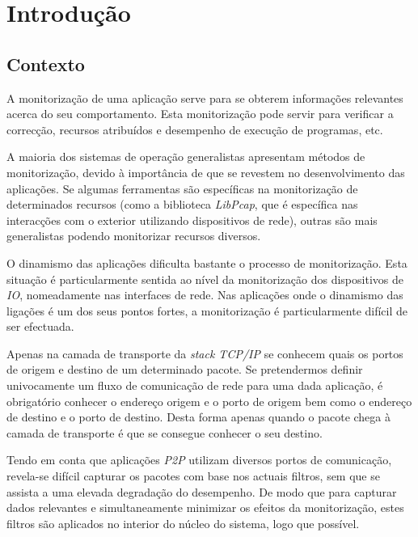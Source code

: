 \chapter{Introdução}\label{cap:introducao}

\section{Contexto}
\label{sec:intro_context}
A monitorização de uma aplicação serve para se obterem informações relevantes acerca do seu comportamento.
Esta monitorização pode servir para verificar a correcção, recursos atribuídos e desempenho de execução de programas, etc.

A maioria dos sistemas de operação generalistas apresentam métodos de monitorização, devido à importância de que se revestem no desenvolvimento das aplicações.
Se algumas ferramentas são específicas na monitorização de determinados recursos (como a biblioteca \textit{LibPcap}, que é específica nas interacções com o exterior utilizando dispositivos de rede), outras são mais generalistas podendo monitorizar recursos diversos.

O dinamismo das aplicações dificulta bastante o processo de monitorização.
Esta situação é particularmente sentida ao nível da monitorização dos dispositivos de \textit{IO}, nomeadamente nas interfaces de rede.
Nas aplicações onde o dinamismo das ligações é um dos seus pontos fortes, a monitorização é particularmente difícil de ser efectuada.

Apenas na camada de transporte da \textit{stack TCP/IP} se conhecem quais os portos de origem e destino de um determinado pacote.
Se pretendermos definir univocamente um fluxo de comunicação de rede para uma dada aplicação, é obrigatório conhecer o endereço origem e o porto de origem bem como o endereço de destino e o porto de destino.
Desta forma apenas quando o pacote chega à camada de transporte é que se consegue conhecer o seu destino.

Tendo em conta que aplicações \textit{P2P} utilizam diversos portos de comunicação, revela-se difícil capturar os pacotes com base nos actuais filtros, sem que se assista a uma elevada degradação do desempenho.
De modo que para capturar dados relevantes e simultaneamente minimizar os efeitos da monitorização, estes filtros são aplicados no interior do núcleo do sistema, logo que possível.

